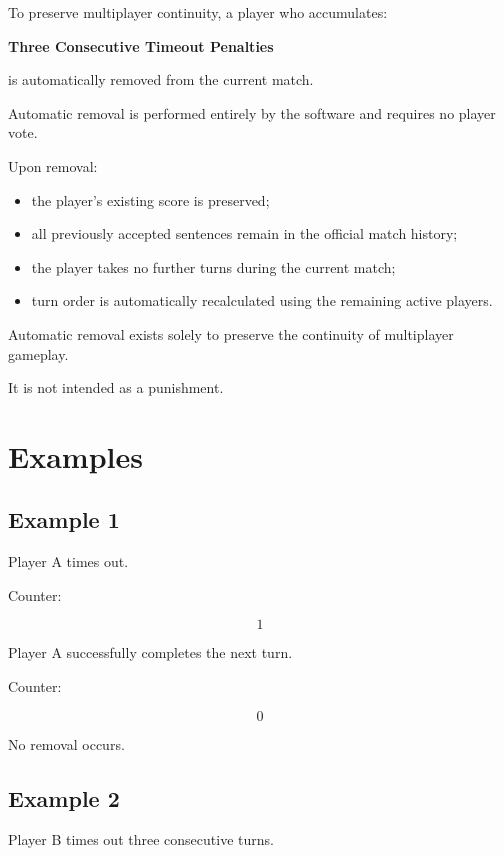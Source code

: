 \documentclass[11pt,a4paper]{article}
\begin{document}
To preserve multiplayer continuity, a player who accumulates:

\begin{center}
\Large\textbf{Three Consecutive Timeout Penalties}
\end{center}

is automatically removed from the current match.

Automatic removal is performed entirely by the software and requires no player vote.

Upon removal:

\begin{itemize}
    \item the player's existing score is preserved;
    \item all previously accepted sentences remain in the official match history;
    \item the player takes no further turns during the current match;
    \item turn order is automatically recalculated using the remaining active players.
\end{itemize}

Automatic removal exists solely to preserve the continuity of multiplayer gameplay.

It is not intended as a punishment.

\section{Examples}

\subsection*{Example 1}

Player A times out.

Counter:

\[
1
\]

Player A successfully completes the next turn.

Counter:

\[
0
\]

No removal occurs.

\subsection*{Example 2}

Player B times out three consecutive turns.
\end{document}
